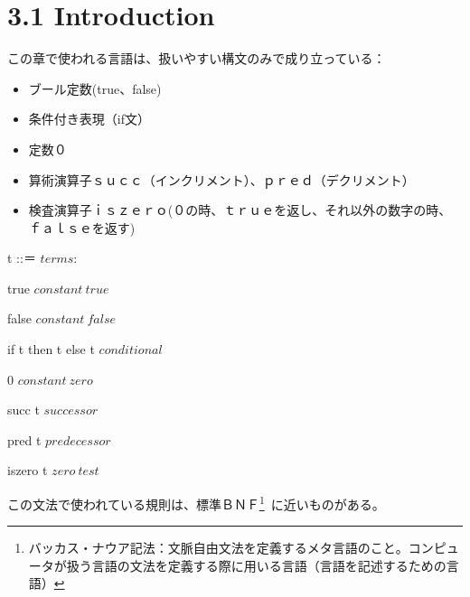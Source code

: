 \documentclass{jsarticle}
\begin{document}
\newpage
{\large
\section{3.1 Introduction}

この章で使われる言語は、扱いやすい構文のみで成り立っている：

\begin{itemize}
\item ブール定数(true、false)
\item 条件付き表現（if文）
\item 定数０
\item 算術演算子ｓｕｃｃ（インクリメント）、ｐｒｅｄ（デクリメント）
\item 検査演算子ｉｓｚｅｒｏ(０の時、ｔｒｕｅを返し、それ以外の数字の時、ｆａｌｓｅを返す)
\end{itemize}


t ::＝ \hspace{25zw} $terms:$ 

\hspace*{3zw}true     \hspace{20.5zw}                            $constant\ true$
   
\hspace*{3zw}false          \hspace{20zw}                      $constant\ false$
     
\hspace*{3zw}if  t  then  t  else  t    \hspace{16zw}           $conditional$
     
\hspace*{3zw}0                \hspace{22zw}                     $constant\ zero$
     
\hspace*{3zw}succ  t           \hspace{21zw}                    $successor$
     
\hspace*{3zw}pred  t             \hspace{20.5zw}                  $predecessor$
     
\hspace*{3zw}iszero  t          \hspace{20.5zw}                 $zero\ test$


\vspace*{1zw}

この文法で使われている規則は、標準ＢＮＦ\footnote{
{\large バッカス・ナウア記法：文脈自由文法を定義するメタ言語のこと。コンピュータが扱う言語の文法を定義する際に用いる言語（言語を記述するための言語）}}\
に近いものがある。

}
\end{document}
